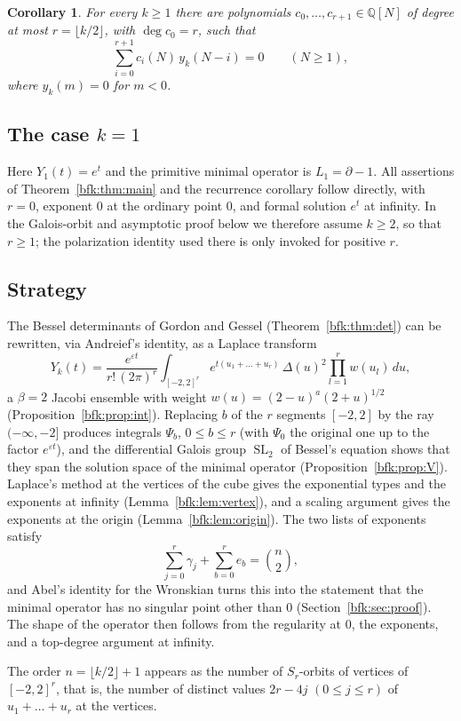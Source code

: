 \documentclass[11pt,a4paper]{article}
\newtheorem{corollary}[theorem]{Corollary}
\theoremstyle{definition}
\theoremstyle{remark}
\numberwithin{equation}{section}
\newcommand{\Q}{\mathbb{Q}}
\newcommand{\fl}[1]{\lfloor #1\rfloor}
\DeclareMathOperator{\SL}{SL}
\begin{document}
\begin{corollary}\label{bfk:cor:rec}
For every $k\ge1$ there are polynomials $c_0,\dots,c_{r+1}\in\Q[N]$ of degree at most $r=\fl{k/2}$, with $\deg c_0=r$, such that
\[
\sum_{i=0}^{r+1}c_i(N)\,y_k(N-i)=0\qquad (N\ge 1),
\]
where $y_k(m)=0$ for $m<0$.
\end{corollary}

\subsection*{The case $k=1$}
Here $Y_1(t)=e^t$ and the primitive minimal operator is $L_1=\partial-1$.
All assertions of Theorem~\ref{bfk:thm:main} and the recurrence corollary follow
directly, with $r=0$, exponent $0$ at the ordinary point $0$, and formal
solution $e^t$ at infinity. In the Galois-orbit and asymptotic proof below we
therefore assume $k\ge2$, so that $r\ge1$; the polarization identity used there
is only invoked for positive $r$.

\subsection*{Strategy}
The Bessel determinants of Gordon and Gessel (Theorem~\ref{bfk:thm:det}) can be rewritten, via Andreief's identity, as a Laplace transform
\[
Y_k(t)=\frac{e^{\varepsilon t}}{r!\,(2\pi)^r}\int_{[-2,2]^r}e^{t(u_1+\dots+u_r)}\,\Delta(u)^2\prod_{l=1}^r w(u_l)\,du ,
\]
a $\beta=2$ Jacobi ensemble with weight $w(u)=(2-u)^{a}(2+u)^{1/2}$ (Proposition~\ref{bfk:prop:int}). Replacing $b$ of the $r$ segments $[-2,2]$ by the ray $(-\infty,-2]$ produces integrals $\Psi_b$, $0\le b\le r$ (with $\Psi_0$ the original one up to the factor $e^{\varepsilon t}$), and the differential Galois group $\SL_2$ of Bessel's equation shows that they span the solution space of the minimal operator (Proposition~\ref{bfk:prop:V}). Laplace's method at the vertices of the cube gives the exponential types and the exponents at infinity (Lemma~\ref{bfk:lem:vertex}), and a scaling argument gives the exponents at the origin (Lemma~\ref{bfk:lem:origin}). The two lists of exponents satisfy
\[
\sum_{j=0}^{r}\gamma_j+\sum_{b=0}^{r}e_b=\binom{n}{2},
\]
and Abel's identity for the Wronskian turns this into the statement that the minimal operator has no singular point other than $0$ (Section~\ref{bfk:sec:proof}). The shape of the operator then follows from the regularity at $0$, the exponents, and a top-degree argument at infinity.

The order $n=\fl{k/2}+1$ appears as the number of $S_r$-orbits of vertices of $[-2,2]^r$, that is, the number of distinct values $2r-4j$ $(0\le j\le r)$ of $u_1+\dots+u_r$ at the vertices.
\end{document}
